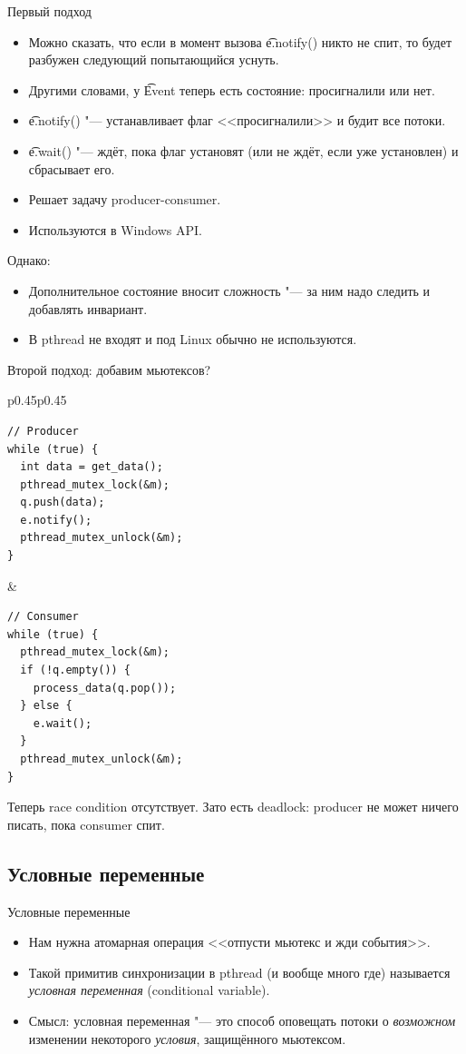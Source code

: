 \begin{frame}{Первый подход}
	\begin{itemize}
		\item Можно сказать, что если в момент вызова \t{e.notify()} никто не спит, то будет разбужен следующий попытающийся уснуть.
		\item Другими словами, у \t{Event} теперь есть состояние: просигналили или нет.
		\item \t{e.notify()} "--- устанавливает флаг <<просигналили>> и будит все потоки.
		\item \t{e.wait()} "--- ждёт, пока флаг установят (или не ждёт, если уже установлен) и сбрасывает его.
		\item Решает задачу producer-consumer.
		\item Используются в Windows API.
	\end{itemize}
	Однако:
	\begin{itemize}
		\item Дополнительное состояние вносит сложность "--- за ним надо следить и добавлять инвариант.
		\item В pthread не входят и под Linux обычно не используются.
	\end{itemize}
\end{frame}

\begin{frame}[fragile]{Второй подход: добавим мьютексов?}
	\begin{tabular}{p{0.45\linewidth}p{0.45\linewidth}}
		\centering
\begin{verbatim}
// Producer
while (true) {
  int data = get_data();
  pthread_mutex_lock(&m);
  q.push(data);
  e.notify();
  pthread_mutex_unlock(&m);
}
\end{verbatim}
&
\begin{verbatim}
// Consumer
while (true) {
  pthread_mutex_lock(&m);
  if (!q.empty()) {
    process_data(q.pop());
  } else {
    e.wait();
  }
  pthread_mutex_unlock(&m);
}
\end{verbatim}
	\end{tabular}
	Теперь race condition отсутствует.
	\pause
	Зато есть deadlock: producer не может ничего писать, пока consumer спит.
\end{frame}

\subsection{Условные переменные}

\begin{frame}{Условные переменные}
	\begin{itemize}
		\item Нам нужна атомарная операция <<отпусти мьютекс и жди события>>.
		\item Такой примитив синхронизации в pthread (и вообще много где) называется \textit{условная переменная} (conditional variable).
		\item Смысл: условная переменная "--- это способ оповещать потоки о \textit{возможном} изменении некоторого \textit{условия}, защищённого мьютексом.
	\end{itemize}
\end{frame}

